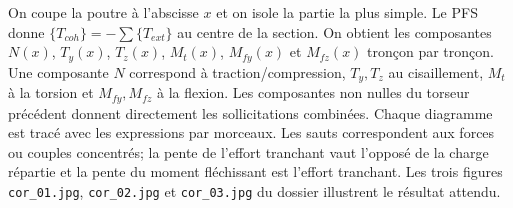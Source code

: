 \begin{corrigebox}
On coupe la poutre à l'abscisse $x$ et on isole la partie la plus simple.
            Le PFS donne $\{T_{coh}\}=-\sum\{T_{ext}\}$ au centre de la section. On
            obtient les composantes $N(x)$, $T_y(x)$, $T_z(x)$,
            $M_t(x)$, $M_{fy}(x)$ et $M_{fz}(x)$ tronçon par tronçon.
Une composante $N$ correspond à traction/compression, $T_y,T_z$ au
            cisaillement, $M_t$ à la torsion et $M_{fy},M_{fz}$ à la flexion. Les
            composantes non nulles du torseur précédent donnent directement les
            sollicitations combinées.
Chaque diagramme est tracé avec les expressions par morceaux. Les sauts
            correspondent aux forces ou couples concentrés; la pente de l'effort tranchant
            vaut l'opposé de la charge répartie et la pente du moment fléchissant est
            l'effort tranchant. Les trois figures \texttt{cor\_01.jpg}, \texttt{cor\_02.jpg} et
            \texttt{cor\_03.jpg} du dossier illustrent le résultat attendu.
\end{corrigebox}
